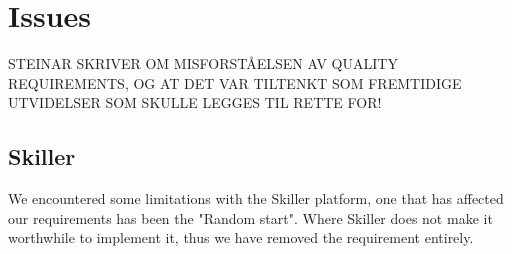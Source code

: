 \section{Issues}

STEINAR SKRIVER OM MISFORSTÅELSEN AV QUALITY REQUIREMENTS, OG AT DET VAR TILTENKT SOM FREMTIDIGE UTVIDELSER SOM SKULLE LEGGES TIL RETTE FOR!

\subsection{Skiller}
We encountered some limitations with the Skiller platform, one that has affected our requirements has been the "Random start". Where Skiller does not make it worthwhile to implement it, thus we have removed the requirement entirely.